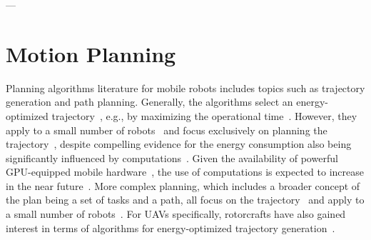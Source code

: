 ---





\section{\color{cyan}Motion Planning}
\label{sec:soa-motion-pl}

Planning algorithms literature for mobile robots includes topics such as trajectory generation and path planning. Generally, the algorithms select an energy-optimized trajectory~\cite{mei2004energy}, e.g., by maximizing the operational time~\cite{wahab2015energy}. However, they apply to a small number of robots~\cite{kim2005energy} and focus exclusively on planning the trajectory~\cite{kim2008minimum}, despite compelling evidence for the energy consumption also being significantly influenced by computations~\cite{mei2005case}. Given the availability of powerful GPU-equipped mobile hardware~\cite{rizvi2017general}, the use of computations is expected to increase in the near future~\cite{abramov2012real,satria2016real,jaramillo2019visual}. More complex planning, which includes a broader concept of the plan being a set of tasks and a path, all focus on the trajectory~\cite{mei2005case,mei2006deployment} and apply to a small number of robots~\cite{sadrpour2013mission,sadrpour2013experimental}. For UAVs specifically, rotorcrafts have also gained interest in terms of algorithms for energy-optimized trajectory generation~\cite{morbidi2016minimum,kreciglowa2017energy}. 

